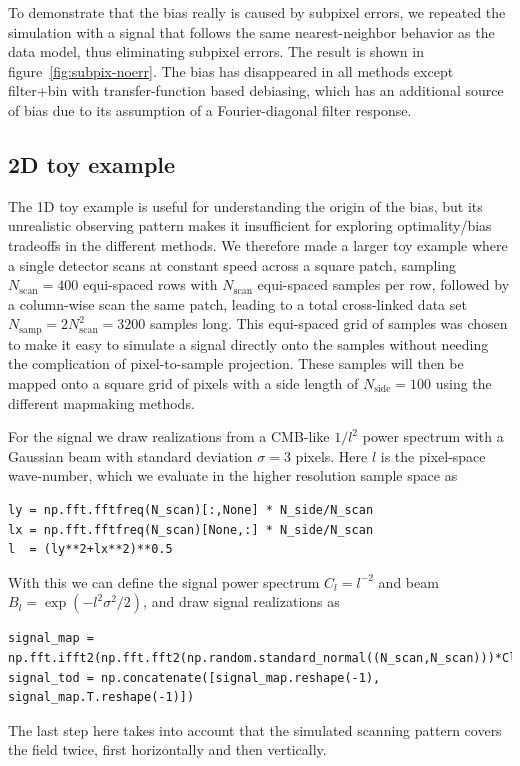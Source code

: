 \documentclass{aa}
\begin{document}
To demonstrate that the bias really is caused by subpixel errors,
we repeated the simulation with a signal that follows the same nearest-neighbor
behavior as the data model, thus eliminating subpixel errors. The
result is shown in figure~\ref{fig:subpix-noerr}. The bias has disappeared
in all methods except filter+bin with transfer-function based debiasing,
which has an additional source of bias due to its assumption of a Fourier-diagonal
filter response.

\subsection{2D toy example}
\label{sec:toy-2d}
The 1D toy example is useful for understanding the origin of the bias, but
its unrealistic observing pattern makes it insufficient for exploring
optimality/bias tradeoffs in the different methods. We therefore made a larger
toy example where a single detector scans at constant speed across a square
patch, sampling $N_\text{scan} = 400$ equi-spaced rows with $N_\text{scan}$
equi-spaced samples per row, followed by a column-wise scan the same patch,
leading to a total cross-linked data set $N_\text{samp} = 2 N_\text{scan}^2 = 3200$
samples long. This equi-spaced grid of samples was chosen to make it easy to
simulate a signal directly onto the samples without needing the complication
of pixel-to-sample projection. These samples will then be mapped onto a
square grid of pixels with a side length of $N_\text{side} = 100$ using
the different mapmaking methods.

For the signal we draw realizations from a CMB-like $1/l^2$ power spectrum
with a Gaussian beam with standard deviation $\sigma=3$ pixels. Here $l$
is the pixel-space wave-number, which we evaluate in the higher
resolution sample space as
\begin{lstlisting}
ly = np.fft.fftfreq(N_scan)[:,None] * N_side/N_scan
lx = np.fft.fftfreq(N_scan)[None,:] * N_side/N_scan
l  = (ly**2+lx**2)**0.5
\end{lstlisting}
With this we can define the signal power spectrum $C_l = l^{-2}$ and beam $B_l = \exp(-l^2 \sigma^2/2)$,
and draw signal realizations as
\begin{lstlisting}
signal_map = np.fft.ifft2(np.fft.fft2(np.random.standard_normal((N_scan,N_scan)))*Cl**0.5*Bl).real
signal_tod = np.concatenate([signal_map.reshape(-1), signal_map.T.reshape(-1)])
\end{lstlisting}
The last step here takes into account that the simulated scanning pattern covers the
field twice, first horizontally and then vertically.
\end{document}
